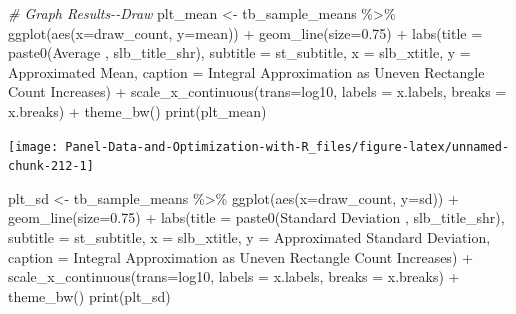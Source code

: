 \documentclass[
]{book}
\newenvironment{Shaded}{\begin{snugshade}}{\end{snugshade}}
\newcommand{\AttributeTok}[1]{\textcolor[rgb]{0.77,0.63,0.00}{#1}}
\newcommand{\CommentTok}[1]{\textcolor[rgb]{0.56,0.35,0.01}{\textit{#1}}}
\newcommand{\FloatTok}[1]{\textcolor[rgb]{0.00,0.00,0.81}{#1}}
\newcommand{\FunctionTok}[1]{\textcolor[rgb]{0.00,0.00,0.00}{#1}}
\newcommand{\NormalTok}[1]{#1}
\newcommand{\OtherTok}[1]{\textcolor[rgb]{0.56,0.35,0.01}{#1}}
\newcommand{\SpecialCharTok}[1]{\textcolor[rgb]{0.00,0.00,0.00}{#1}}
\newcommand{\StringTok}[1]{\textcolor[rgb]{0.31,0.60,0.02}{#1}}
\begin{document}
\begin{Shaded}
\begin{Highlighting}[]
\CommentTok{\# Graph Results{-}{-}Draw}
\NormalTok{plt\_mean }\OtherTok{\textless{}{-}}\NormalTok{ tb\_sample\_means }\SpecialCharTok{\%\textgreater{}\%}
  \FunctionTok{ggplot}\NormalTok{(}\FunctionTok{aes}\NormalTok{(}\AttributeTok{x=}\NormalTok{draw\_count, }\AttributeTok{y=}\NormalTok{mean)) }\SpecialCharTok{+}
  \FunctionTok{geom\_line}\NormalTok{(}\AttributeTok{size=}\FloatTok{0.75}\NormalTok{) }\SpecialCharTok{+}
  \FunctionTok{labs}\NormalTok{(}\AttributeTok{title =} \FunctionTok{paste0}\NormalTok{(}\StringTok{\textquotesingle{}Average \textquotesingle{}}\NormalTok{, slb\_title\_shr),}
       \AttributeTok{subtitle =}\NormalTok{ st\_subtitle,}
       \AttributeTok{x =}\NormalTok{ slb\_xtitle,}
       \AttributeTok{y =} \StringTok{\textquotesingle{}Approximated Mean\textquotesingle{}}\NormalTok{,}
       \AttributeTok{caption =} \StringTok{\textquotesingle{}Integral Approximation as Uneven Rectangle Count Increases\textquotesingle{}}\NormalTok{) }\SpecialCharTok{+}
  \FunctionTok{scale\_x\_continuous}\NormalTok{(}\AttributeTok{trans=}\StringTok{\textquotesingle{}log10\textquotesingle{}}\NormalTok{, }\AttributeTok{labels =}\NormalTok{ x.labels, }\AttributeTok{breaks =}\NormalTok{ x.breaks) }\SpecialCharTok{+}
  \FunctionTok{theme\_bw}\NormalTok{()}
\FunctionTok{print}\NormalTok{(plt\_mean)}
\end{Highlighting}
\end{Shaded}

\begin{center}\texttt{[image: Panel-Data-and-Optimization-with-R\_files/figure-latex/unnamed-chunk-212-1]} \end{center}

\begin{Shaded}
\begin{Highlighting}[]
\NormalTok{plt\_sd }\OtherTok{\textless{}{-}}\NormalTok{ tb\_sample\_means }\SpecialCharTok{\%\textgreater{}\%}
  \FunctionTok{ggplot}\NormalTok{(}\FunctionTok{aes}\NormalTok{(}\AttributeTok{x=}\NormalTok{draw\_count, }\AttributeTok{y=}\NormalTok{sd)) }\SpecialCharTok{+}
  \FunctionTok{geom\_line}\NormalTok{(}\AttributeTok{size=}\FloatTok{0.75}\NormalTok{) }\SpecialCharTok{+}
  \FunctionTok{labs}\NormalTok{(}\AttributeTok{title =} \FunctionTok{paste0}\NormalTok{(}\StringTok{\textquotesingle{}Standard Deviation \textquotesingle{}}\NormalTok{, slb\_title\_shr),}
       \AttributeTok{subtitle =}\NormalTok{ st\_subtitle,}
       \AttributeTok{x =}\NormalTok{ slb\_xtitle,}
       \AttributeTok{y =} \StringTok{\textquotesingle{}Approximated Standard Deviation\textquotesingle{}}\NormalTok{,}
       \AttributeTok{caption =} \StringTok{\textquotesingle{}Integral Approximation as Uneven Rectangle Count Increases\textquotesingle{}}\NormalTok{) }\SpecialCharTok{+}
  \FunctionTok{scale\_x\_continuous}\NormalTok{(}\AttributeTok{trans=}\StringTok{\textquotesingle{}log10\textquotesingle{}}\NormalTok{, }\AttributeTok{labels =}\NormalTok{ x.labels, }\AttributeTok{breaks =}\NormalTok{ x.breaks) }\SpecialCharTok{+}
  \FunctionTok{theme\_bw}\NormalTok{()}
\FunctionTok{print}\NormalTok{(plt\_sd)}
\end{Highlighting}
\end{Shaded}
\end{document}
